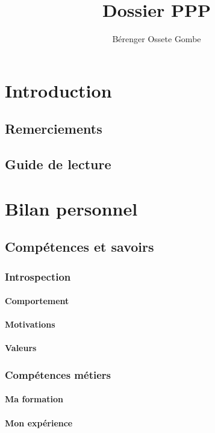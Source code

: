 \documentclass[a4paper]{report}
\author{Bérenger Ossete Gombe}
\title{Dossier PPP}
\begin{document}
\maketitle

\newpage
\tableofcontents{}
\newpage

\part{Introduction}
\chapter{Remerciements}
\chapter{Guide de lecture}

\part{Bilan personnel}

\chapter{Compétences et savoirs} 
\section{Introspection}
\subsection{Comportement}
\subsection{Motivations}
\subsection{Valeurs}

\section{Compétences métiers} 
\subsection{Ma formation}
\subsection{Mon expérience}
\end{document}
